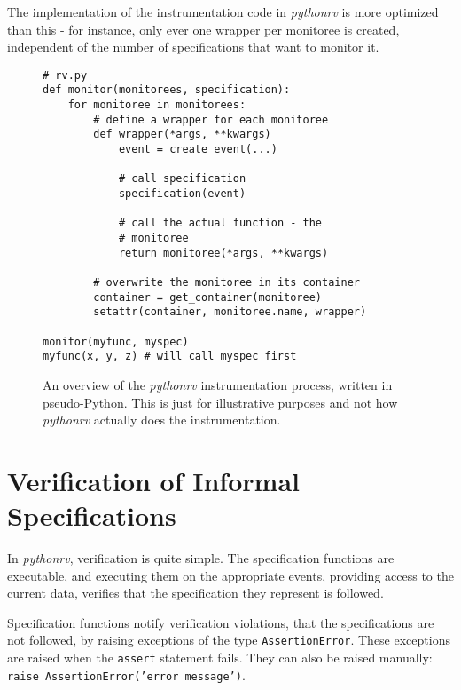 \documentclass[a4paper,11pt]{kth-mag}
\theoremstyle{definition}
\begin{document}
The implementation of the instrumentation code in \textit{pythonrv} is more
optimized than this - for instance, only ever one wrapper per monitoree is
created, independent of the number of specifications that want to monitor it.

\begin{figure}[h!]
	\begin{center}
	\begin{minipage}{0.7\textwidth}
	\begin{lstlisting}
# rv.py
def monitor(monitorees, specification):
	for monitoree in monitorees:
		# define a wrapper for each monitoree
		def wrapper(*args, **kwargs)
			event = create_event(...)

			# call specification
			specification(event)

			# call the actual function - the
			# monitoree
			return monitoree(*args, **kwargs)

		# overwrite the monitoree in its container
		container = get_container(monitoree)
		setattr(container, monitoree.name, wrapper)

monitor(myfunc, myspec)
myfunc(x, y, z) # will call myspec first
	\end{lstlisting}
	\end{minipage}
	\end{center}

	\caption{An overview of the \textit{pythonrv} instrumentation process,
		written in pseudo-Python. This is just for illustrative purposes and not
		how \textit{pythonrv} actually does the instrumentation.}
	\label{figure-instrumentation-overview}
\end{figure}



\section{Verification of Informal Specifications}
\label{section-approach-verification}

In \textit{pythonrv}, verification is quite simple. The specification functions
are executable, and executing them on the appropriate events, providing access
to the current data, verifies that the specification they represent is
followed.

Specification functions notify verification violations, that the specifications
are not followed, by raising exceptions of the type \texttt{AssertionError}.
These exceptions are raised when the \texttt{assert} statement fails. They can
also be raised manually: \texttt{raise AssertionError('error message')}.
\end{document}
